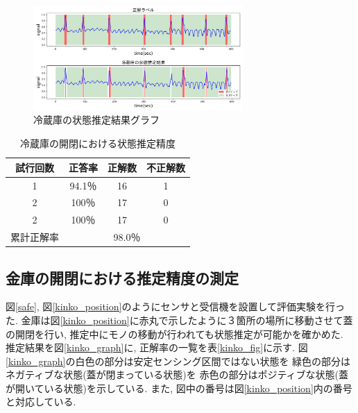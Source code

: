 \documentclass[Japanese]{dicomopapers}
\begin{document}
\begin{figure}[ht]
    \centering
    \includegraphics[width=8cm]{refrigerator_graph.png}
    \caption{冷蔵庫の状態推定結果グラフ}
    \label{refrigerator_graph}
\end{figure}



\begin{table}[htb]
    \begin{center}
        \caption{冷蔵庫の開閉における状態推定精度}
        \label{refrigerator_fig}
        \begin{tabular}{|c|c|c|c|} \hline
        試行回数 & 正答率 & 正解数 & 不正解数 \\ \hline
        1 & 94.1％ & 16 & 1 \\ \hline
        2 & 100％ & 17 & 0 \\ \hline
        2 & 100％ & 17 & 0 \\ \hline \hline
        累計正解率 & \multicolumn{3}{c|}{98.0％} \\ \hline
        \end{tabular}
    \end{center}
\end{table}



\subsection{金庫の開閉における推定精度の測定}
図\ref{safe}, 図\ref{kinko_position}のようにセンサと受信機を設置して評価実験を行った.
金庫は図\ref{kinko_position}に赤丸で示したように３箇所の場所に移動させて蓋の開閉を行い, 推定中にモノの移動が行われても状態推定が可能かを確かめた.
推定結果を図\ref{kinko_graph}に, 正解率の一覧を表\ref{kinko_fig}に示す.
図\ref{kinko_graph}の白色の部分は安定センシング区間ではない状態を 緑色の部分はネガティブな状態(蓋が閉まっている状態)を 赤色の部分はポジティブな状態(蓋が開いている状態)を示している.
また, 図中の番号は図\ref{kinko_position}内の番号と対応している.
\end{document}
